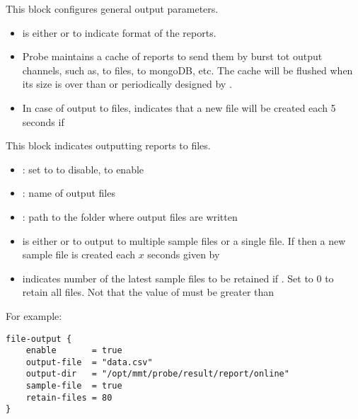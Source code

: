 This block configures general output parameters.
\begin{itemize}
  \item {} is either  or  to indicate format of the reports.
  \item Probe maintains a cache of reports to send them by burst tot output channels, such as, to files, to mongoDB, etc.
  The cache will be flushed when its size is over than  or periodically designed by .
  
  \item In case of output to files,  indicates that a new file will be created each 5 seconds if  
\end{itemize}


This block indicates outputting reports to files.

\begin{itemize}
  \item {}: set to \false to disable, \true to enable
  \item {}: name of output files
  \item {}: path to the folder where output files are written
  \item {} is either \true or \false to output to multiple sample files or a single file. 
         If \true then a new sample file is created each $x$ seconds given by  
  \item {} indicates number of the latest sample files to be retained if .
        Set to $0$ to retain all files. Not that the value of  must be greater than 
\end{itemize}

For example: 

\begin{lstlisting}[style=CONFIG]
file-output {
    enable       = true  
    output-file  = "data.csv"      
    output-dir   = "/opt/mmt/probe/result/report/online" 
    sample-file  = true
    retain-files = 80
}
\end{lstlisting}

